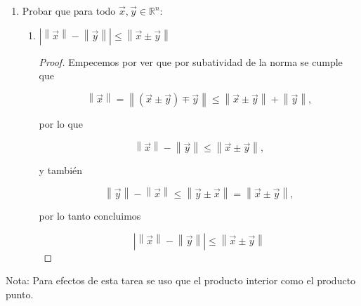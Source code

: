 \documentclass[letterpaper]{article}
\theoremstyle{definition}
\theoremstyle{lemathm}
\theoremstyle{lemathm}
\theoremstyle{lemathm}
\theoremstyle{lemademthm}
\newcommand{\abs}[1]{\left| #1 \right| }
\newcommand{\pars}[1]{\left( #1 \right) }
\newcommand{\norm}[1]{\left\lVert#1\right\rVert}
\newcommand{\RR}{\mathbb{R}}
\newcommand{\1}{\mathbbm{1}}
\begin{document}
\begin{enumerate}
\begin{proof}
\begin{itemize}
				\[\sum_{i=2}^n \frac{\lambda_i}{1-\lambda_1}x_i \in X,\]

				por último, de nuevo por hipotesis de inducción concluimos que

				\[\sum_{i=1}^n \lambda_ix_i = \lambda_1x_1 + \pars{1-\lambda_1}\sum_{i=2}^n \frac{\lambda_i}{1-\lambda_1}x_i \in X.\]
			\end{itemize}

			Por Inducción Matemática concluimos que toda combinación convexa de un conjunto convexo pertenece a este.
		\end{proof}

		\newpage

		\item Probar que para todo $\vec{x},\vec{y}\in\RR^n$:
		
		\begin{enumerate}
			\item $\abs{\norm{\vec{x}}-\norm{\vec{y}}}\leq\norm{\vec{x}\pm\vec{y}}$
			
			\begin{proof}
				Empecemos por ver que por subatividad de la norma se cumple que

				\[\norm{\vec{x}} = \norm{\pars{\vec{x}\pm\vec{y}} \mp \vec{y}} \leq \norm{\vec{x} \pm \vec{y}} + \norm{\vec{y}},\]

				por lo que

				\[\norm{\vec{x}} - \norm{\vec{y}} \leq \norm{\vec{x}\pm\vec{y}},\]

				y también

				\[\norm{\vec{y}} - \norm{\vec{x}} \leq \norm{\vec{y}\pm\vec{x}} = \norm{\vec{x}\pm\vec{y}},\]

				por lo tanto concluimos

				\[\abs{\norm{\vec{x}}-\norm{\vec{y}}}\leq\norm{\vec{x}\pm\vec{y}}\]


			\end{proof}

		\end{enumerate}

	\end{enumerate}

	Nota: Para efectos de esta tarea se uso que el producto interior como el producto punto.
\end{document}

